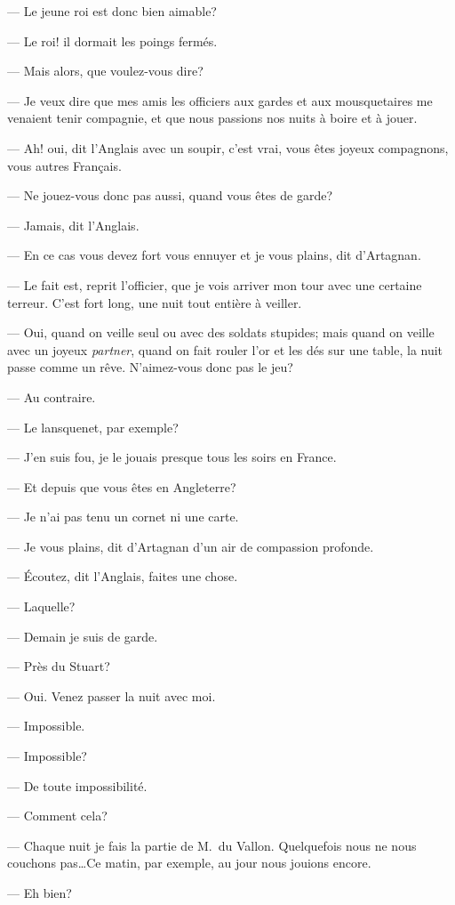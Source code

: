 — Le jeune roi est donc bien aimable?

— Le roi! il dormait les poings fermés.

— Mais alors, que voulez-vous dire?

— Je veux dire que mes amis les officiers aux gardes et aux mousquetaires me venaient tenir compagnie, et que nous passions nos nuits à boire et à jouer.

— Ah! oui, dit l'Anglais avec un soupir, c'est vrai, vous êtes joyeux compagnons, vous autres Français.

— Ne jouez-vous donc pas aussi, quand vous êtes de garde?

— Jamais, dit l'Anglais.

— En ce cas vous devez fort vous ennuyer et je vous plains, dit d'Artagnan.

— Le fait est, reprit l'officier, que je vois arriver mon tour avec une certaine terreur. C'est fort long, une nuit tout entière à veiller.

— Oui, quand on veille seul ou avec des soldats stupides; mais quand on veille avec un joyeux \textit{partner}, quand on fait rouler l'or et les dés sur une table, la nuit passe comme un rêve. N'aimez-vous donc pas le jeu?

— Au contraire.

— Le lansquenet, par exemple?

— J'en suis fou, je le jouais presque tous les soirs en France.

— Et depuis que vous êtes en Angleterre?

— Je n'ai pas tenu un cornet ni une carte.

— Je vous plains, dit d'Artagnan d'un air de compassion profonde.

— Écoutez, dit l'Anglais, faites une chose.

— Laquelle?

— Demain je suis de garde.

— Près du Stuart?

— Oui. Venez passer la nuit avec moi.

— Impossible.

— Impossible?

— De toute impossibilité.

— Comment cela?

— Chaque nuit je fais la partie de M.~du Vallon. Quelquefois nous ne nous couchons pas\dots Ce matin, par exemple, au jour nous jouions encore.

— Eh bien?

